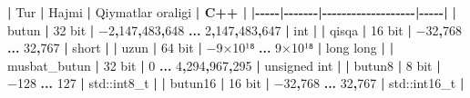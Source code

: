 \documentclass[a4paper,11pt,twoside,openright]{book}
\newenvironment{Shaded}{\begin{snugshade}}{\end{snugshade}}
\newcommand{\BuiltInTok}[1]{#1}
\newcommand{\CharTok}[1]{\textcolor[rgb]{0.31,0.60,0.02}{#1}}
\newcommand{\DecValTok}[1]{\textcolor[rgb]{0.00,0.00,0.81}{#1}}
\newcommand{\ErrorTok}[1]{\textcolor[rgb]{0.64,0.00,0.00}{\textbf{#1}}}
\newcommand{\NormalTok}[1]{#1}
\newcommand{\OperatorTok}[1]{\textcolor[rgb]{0.81,0.36,0.00}{\textbf{#1}}}
\begin{document}
\begin{Shaded}
\begin{Highlighting}[]
\OperatorTok{|}\NormalTok{ Tur }\OperatorTok{|}\NormalTok{ Hajmi }\OperatorTok{|}\NormalTok{ Qiymatlar oralig}\CharTok{\textquotesingle{}i}\ErrorTok{ | C++ |}
\OperatorTok{|{-}{-}{-}{-}{-}|{-}{-}{-}{-}{-}{-}{-}|{-}{-}{-}{-}{-}{-}{-}{-}{-}{-}{-}{-}{-}{-}{-}{-}{-}{-}{-}|{-}{-}{-}{-}{-}|}
\OperatorTok{|} \ErrorTok{\textasciigrave{}}\NormalTok{butun}\ErrorTok{\textasciigrave{}} \OperatorTok{|} \DecValTok{32}\NormalTok{ bit }\OperatorTok{|}\NormalTok{ −}\DecValTok{2}\OperatorTok{,}\DecValTok{147}\OperatorTok{,}\DecValTok{483}\OperatorTok{,}\DecValTok{648} \OperatorTok{...} \DecValTok{2}\OperatorTok{,}\DecValTok{147}\OperatorTok{,}\DecValTok{483}\OperatorTok{,}\DecValTok{647} \OperatorTok{|} \ErrorTok{\textasciigrave{}}\NormalTok{int}\ErrorTok{\textasciigrave{}} \OperatorTok{|}
\OperatorTok{|} \ErrorTok{\textasciigrave{}}\NormalTok{qisqa}\ErrorTok{\textasciigrave{}} \OperatorTok{|} \DecValTok{16}\NormalTok{ bit }\OperatorTok{|}\NormalTok{ −}\DecValTok{32}\OperatorTok{,}\DecValTok{768} \OperatorTok{...} \DecValTok{32}\OperatorTok{,}\DecValTok{767} \OperatorTok{|} \ErrorTok{\textasciigrave{}}\NormalTok{short}\ErrorTok{\textasciigrave{}} \OperatorTok{|}
\OperatorTok{|} \ErrorTok{\textasciigrave{}}\NormalTok{uzun}\ErrorTok{\textasciigrave{}} \OperatorTok{|} \DecValTok{64}\NormalTok{ bit }\OperatorTok{|}\NormalTok{ −}\DecValTok{9}\NormalTok{×}\DecValTok{10}\NormalTok{¹⁸ }\OperatorTok{...} \DecValTok{9}\NormalTok{×}\DecValTok{10}\NormalTok{¹⁸ }\OperatorTok{|} \ErrorTok{\textasciigrave{}}\NormalTok{long long}\ErrorTok{\textasciigrave{}} \OperatorTok{|}
\OperatorTok{|} \ErrorTok{\textasciigrave{}}\NormalTok{musbat\_butun}\ErrorTok{\textasciigrave{}} \OperatorTok{|} \DecValTok{32}\NormalTok{ bit }\OperatorTok{|} \DecValTok{0} \OperatorTok{...} \DecValTok{4}\OperatorTok{,}\DecValTok{294}\OperatorTok{,}\DecValTok{967}\OperatorTok{,}\DecValTok{295} \OperatorTok{|} \ErrorTok{\textasciigrave{}}\NormalTok{unsigned int}\ErrorTok{\textasciigrave{}} \OperatorTok{|}
\OperatorTok{|} \ErrorTok{\textasciigrave{}}\NormalTok{butun8}\ErrorTok{\textasciigrave{}} \OperatorTok{|} \DecValTok{8}\NormalTok{ bit }\OperatorTok{|}\NormalTok{ −}\DecValTok{128} \OperatorTok{...} \DecValTok{127} \OperatorTok{|} \ErrorTok{\textasciigrave{}}\BuiltInTok{std::}\NormalTok{int8\_t}\ErrorTok{\textasciigrave{}} \OperatorTok{|}
\OperatorTok{|} \ErrorTok{\textasciigrave{}}\NormalTok{butun16}\ErrorTok{\textasciigrave{}} \OperatorTok{|} \DecValTok{16}\NormalTok{ bit }\OperatorTok{|}\NormalTok{ −}\DecValTok{32}\OperatorTok{,}\DecValTok{768} \OperatorTok{...} \DecValTok{32}\OperatorTok{,}\DecValTok{767} \OperatorTok{|} \ErrorTok{\textasciigrave{}}\BuiltInTok{std::}\NormalTok{int16\_t}\ErrorTok{\textasciigrave{}} \OperatorTok{|}

\end{Highlighting}
\end{Shaded}
\end{document}
